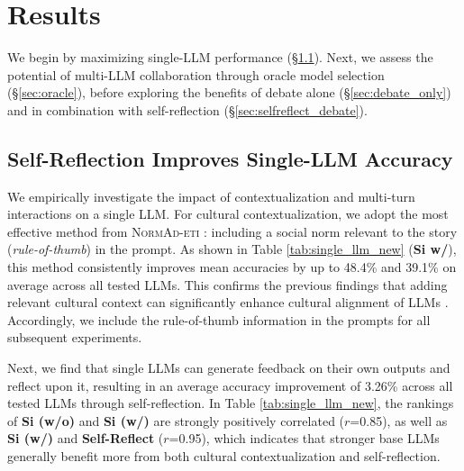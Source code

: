 \section{Results}
\label{sec:results}




We begin by maximizing single-LLM performance (\S \ref{sec:single_model}). Next, we assess the potential of multi-LLM collaboration through oracle model selection (\S \ref{sec:oracle}), before exploring the benefits of debate alone (\S \ref{sec:debate_only}) and in combination with self-reflection (\S \ref{sec:selfreflect_debate}).





\subsection{Self-Reflection Improves Single-LLM Accuracy}
\label{sec:single_model}

We empirically investigate the impact of contextualization and multi-turn interactions on a single LLM. For cultural contextualization, we adopt the most effective method from \textsc{NormAd-eti} \cite{normad}: including a social norm relevant to the story (\textit{rule-of-thumb}) in the prompt. As shown in Table \ref{tab:single_llm_new} (\textbf{Si w/}), this method consistently improves mean accuracies by up to 48.4\% and 39.1\% on average across all tested LLMs. This confirms the previous findings that adding relevant cultural context can significantly enhance cultural alignment of LLMs \cite{zhu-etal-2024-large, normad}. Accordingly, we include the rule-of-thumb information in the prompts for all subsequent experiments.



Next, we find that single LLMs can generate feedback on their own outputs and reflect upon it, resulting in an average accuracy improvement of 3.26\% across all tested LLMs through self-reflection. In Table \ref{tab:single_llm_new}, the rankings of \textbf{Si (w/o)} and \textbf{Si (w/)} are strongly positively correlated ($r$=0.85), as well as \textbf{Si (w/)} and \textbf{Self-Reflect} ($r$=0.95), which indicates that stronger base LLMs generally benefit more from both cultural contextualization and self-reflection. 

